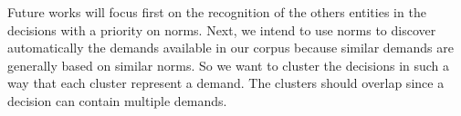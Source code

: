 \documentclass[runningheads,a4paper]{llncs}
\begin{document}
Future works will focus first on the recognition of the others entities in the decisions with a priority on norms. Next, we intend to use norms to discover automatically the demands available in our corpus because similar demands are generally based on similar norms. So we want to cluster the decisions in such a way that each cluster represent a demand. The clusters should overlap since a decision can contain multiple demands.
 



\end{document}

